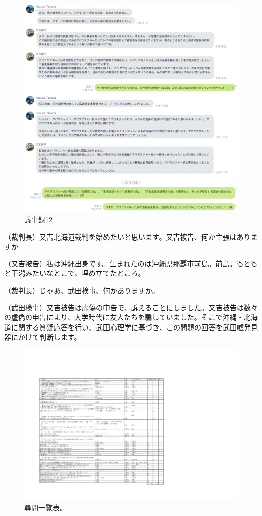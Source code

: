 \begin{figure}[H]
  \centering
  \includegraphics[clip,scale=0.5]{./section/Taira/figures/giji11}
  \caption{議事録12}
\label{giji11}
\end{figure}

（裁判長）又吉北海道裁判を始めたいと思います。又吉被告、何か主張はありますか\par
（又吉被告）私は沖縄出身です。生まれたのは沖縄県那覇市前島。前島。もともと干潟みたいなとこで、埋め立てたところ。\par
（裁判長）じゃあ、武田検事、何かありますか。\par
（武田検事）又吉被告は虚偽の申告で、訴えることにしました。又吉被告は数々の虚偽の申告により、大学時代に友人たちを騙していました。そこで沖縄・北海道に関する質疑応答を行い、武田心理学に基づき、この問題の回答を武田嘘発見器にかけて判断します。\par
\begin{figure}[H]
  \centering
  \includegraphics[clip,scale=0.9]{./section/Taira/figures/situgi}
  \caption{尋問一覧表。}
\label{situgi}
\end{figure}

